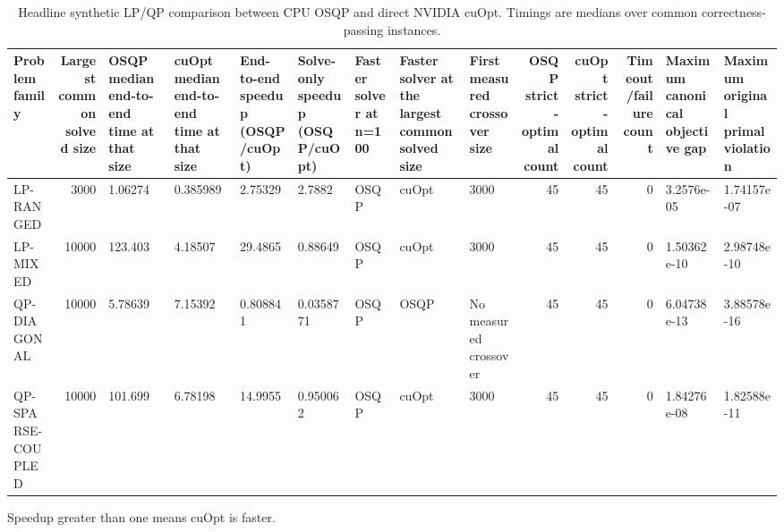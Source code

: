\begin{table}
\caption{Headline synthetic LP/QP comparison between CPU OSQP and direct NVIDIA cuOpt. Timings are medians over common correctness-passing instances.}
\label{tab:osqp-vs-cuopt-headline-table}
\begin{tabular}{lrlllllllrrrll}
\toprule
Problem family & Largest common solved size & OSQP median end-to-end time at that size & cuOpt median end-to-end time at that size & End-to-end speedup (OSQP/cuOpt) & Solve-only speedup (OSQP/cuOpt) & Faster solver at n=100 & Faster solver at the largest common solved size & First measured crossover size & OSQP strict-optimal count & cuOpt strict-optimal count & Timeout/failure count & Maximum canonical objective gap & Maximum original primal violation \\
\midrule
LP-RANGED & 3000 & 1.06274 & 0.385989 & 2.75329 & 2.7882 & OSQP & cuOpt & 3000 & 45 & 45 & 0 & 3.2576e-05 & 1.74157e-07 \\
LP-MIXED & 10000 & 123.403 & 4.18507 & 29.4865 & 0.88649 & OSQP & cuOpt & 3000 & 45 & 45 & 0 & 1.50362e-10 & 2.98748e-10 \\
QP-DIAGONAL & 10000 & 5.78639 & 7.15392 & 0.808841 & 0.0358771 & OSQP & OSQP & No measured crossover & 45 & 45 & 0 & 6.04738e-13 & 3.88578e-16 \\
QP-SPARSE-COUPLED & 10000 & 101.699 & 6.78198 & 14.9955 & 0.950062 & OSQP & cuOpt & 3000 & 45 & 45 & 0 & 1.84276e-08 & 1.82588e-11 \\
\bottomrule
\end{tabular}
\par\footnotesize Speedup greater than one means cuOpt is faster.
\end{table}
